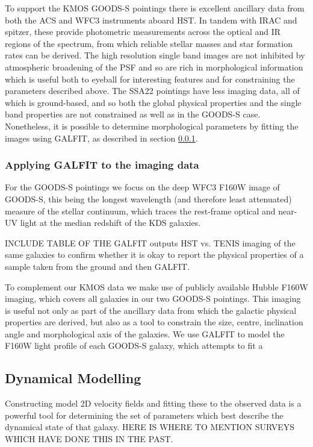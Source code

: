 \documentclass[a4paper,fleqn,usenatbib]{mn2e}
\begin{document}
To support the KMOS GOODS-S pointings there is excellent ancillary data from both the ACS and WFC3 instruments aboard HST.
In tandem with IRAC and spitzer, these provide photometric measurements across the optical and IR regions of the spectrum, from which reliable stellar masses and star formation rates can be derived.
The high resolution single band images are not inhibited by atmospheric broadening of the PSF and so are rich in morphological information which is useful both to eyeball for interesting features and for constraining the parameters described above.
The SSA22 pointings have less imaging data, all of which is ground-based, and so both the global physical properties and the single band properties are not constrained as well as in the GOODS-S case.
Nonetheless, it is possible to determine morphological parameters by fitting the images using GALFIT, as described in section \ref{subsubsec:galfitting}. 

\subsubsection{Applying GALFIT to the imaging data}\label{subsubsec:galfitting}
For the GOODS-S pointings we focus on the deep WFC3 F160W image of GOODS-S, this being the longest wavelength (and therefore least attenuated) measure of the stellar continuum, which traces the rest-frame optical and near-UV light at the median redshift of the KDS galaxies.




INCLUDE TABLE OF THE GALFIT outputs
HST vs. TENIS imaging of the same galaxies to confirm whether it is okay to report the physical properties of a sample taken from the ground and then GALFIT.




   
To complement our KMOS data we make use of publicly available Hubble F160W imaging, which covers all galaxies in our two GOODS-S pointings.
This imaging is useful not only as part of the ancillary data from which the galactic physical properties are derived, but also as a tool to constrain the size, centre, inclination angle and morphological axis of the galaxies. 
We use GALFIT \citep{Peng2010_galfit} to model the F160W light profile of each GOODS-S galaxy, which attempts to fit a 

\subsection{Dynamical Modelling}
Constructing model 2D velocity fields and fitting these to the observed data is a powerful tool for determining the set of parameters which best describe the dynamical state of that galaxy.
HERE IS WHERE TO MENTION SURVEYS WHICH HAVE DONE THIS IN THE PAST.
\end{document}
